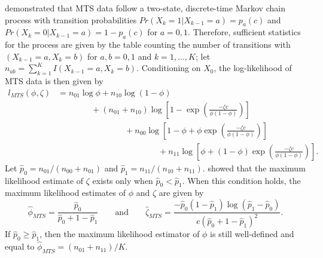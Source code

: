 \documentclass[man, noextraspace, floatsintext]{apa6}\usepackage[]{graphicx}\usepackage[]{color}
\begin{document}
\citet{Brown1977estimation} demonstrated that MTS data follow a two-state, discrete-time Markov chain process with transition probabilities $Pr(X_k = 1 | X_{k-1} = a) = p_a(c)$ and $Pr(X_k = 0 | X_{k-1} = a) = 1 - p_a(c)$ for $a = 0,1$. Therefore, sufficient statistics for the process are given by the table counting the number of transitions with $(X_{k-1} = a, X_k = b)$ for $a,b = 0,1$ and $k = 1,...,K$; let $n_{ab} = \sum_{k=1}^K I(X_{k-1} = a, X_k = b)$. Conditioning on $X_0$, the log-likelihood of MTS data is then given by \begin{equation}
\begin{aligned}
\label{eq:MTS_loglik}
l_{MTS}(\phi, \zeta) &= n_{01} \log \phi + n_{10} \log\left(1 - \phi\right) \\
& \qquad \qquad + \left(n_{01} + n_{10}\right) \log \left[1 - \exp\left(\frac{-\zeta c}{\phi (1 - \phi)}\right)\right] \\
& \qquad \qquad \qquad \qquad + n_{00} \log\left[1 - \phi + \phi \exp\left(\frac{-\zeta c}{\phi (1 - \phi)}\right)\right]\\
& \qquad \qquad \qquad \qquad \qquad \qquad + n_{11}\log\left[\phi + \left(1 - \phi\right)\exp\left(\frac{-\zeta c}{\phi (1 - \phi)}\right)\right].
\end{aligned}
\end{equation}
Let $\hat{p}_0 = n_{01}/ \left(n_{00} + n_{01}\right)$ and $\hat{p}_1 = n_{11} / \left(n_{10} + n_{11}\right)$. \citet{Brown1977estimation} showed that the maximum likelihood estimate of $\zeta$ exists only when $\hat{p}_0 < \hat{p}_1$. When this condition holds, the maximum likelihood estimates of $\phi$ and $\zeta$ are given by 
\begin{equation}
\label{eq:MTS_mle}
\hat\phi_{MTS} = \frac{\hat{p}_0}{\hat{p}_0 + 1 - \hat{p}_1} \qquad \text{and} \qquad
\hat\zeta_{MTS} = \frac{-\hat{p}_0 \left(1 - \hat{p}_1\right) \log(\hat{p}_1 - \hat{p}_0)}{c \left(\hat{p}_0 + 1 - \hat{p}_1\right)^2}.
\end{equation}
If $\hat{p}_0 \geq \hat{p}_1$, then the maximum likelihood estimator of $\phi$ is still well-defined and equal to $\hat\phi_{MTS} = \left(n_{01} + n_{11}\right) / K$. 
\end{document}
